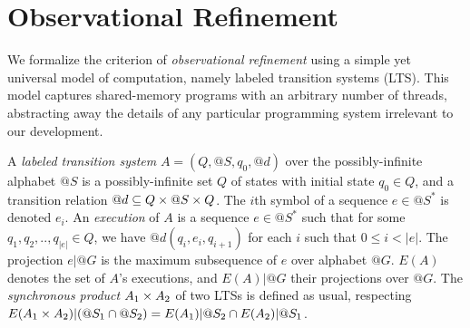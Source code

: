 \section{Observational Refinement}
\label{sec:refinement}


We formalize the criterion of \emph{observational refinement} using a simple
yet universal model of computation, namely labeled transition systems (LTS).
This model captures shared-memory programs with an arbitrary number of threads,
abstracting away the details of any particular programming system irrelevant to
our development.

A \emph{labeled transition system} $A = (Q,@S,q_0,@d)$ over the
possibly-infinite alphabet $@S$ is a possibly-infinite set $Q$ of states with
initial state $q_0 \in Q$, and a transition relation $@d \subseteq Q \times @S \times
Q$. The $i$th symbol of a sequence $e \in @S^*$ is denoted $e_i$. An
\emph{execution} of $A$ is a sequence $e \in @S^*$ such that for some $q_1,
q_2, .., q_{|e|} \in Q$, we have $@d(q_i,e_i,q_{i+1})$ for each $i$ such that
$0 \le i < |e|$. The projection $e|@G$ is the maximum subsequence of $e$ over
alphabet $@G$. $E(A)$ denotes the set of $A$'s executions, and $E(A)|@G$ their
projections over $@G$. The \emph{synchronous product} $A_1 \times A_2$ of two LTSs
is defined as usual, respecting $E(A_1 \times A_2)|(@S_1 \cap @S_2) = E(A_1)|@S_2 \cap
E(A_2)|@S_1$.

%
%  
%

